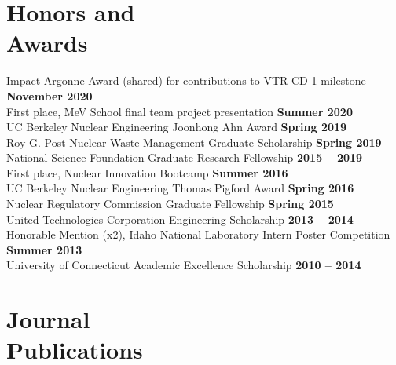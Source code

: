 \documentclass[margin,line]{resume}
\begin{document}
\begin{resume}
\section{\mysidestyle Honors and\\Awards}
Impact Argonne Award (shared) for contributions to VTR CD-1 milestone \hfill \textbf{November 2020}\vspace{.5mm} \\
First place, MeV School final team project presentation \hfill \textbf{Summer 2020}\vspace{.5mm} \\
UC Berkeley Nuclear Engineering Joonhong Ahn Award \hfill \textbf{Spring 2019}\vspace{.5mm} \\
Roy G. Post Nuclear Waste Management Graduate Scholarship \hfill \textbf{Spring 2019}\vspace{.5mm} \\
National Science Foundation Graduate Research Fellowship \hfill \textbf{2015 -- 2019}\vspace{.5mm} \\
First place, Nuclear Innovation Bootcamp \hfill \textbf{Summer 2016}\vspace{.5mm} \\
UC Berkeley Nuclear Engineering Thomas Pigford Award \hfill \textbf{Spring 2016}\vspace{.5mm} \\	
Nuclear Regulatory Commission Graduate Fellowship \hfill \textbf{Spring 2015}\vspace{.5mm} \\
United Technologies Corporation Engineering Scholarship \hfill \textbf{2013 -- 2014}\vspace{.5mm} \\
Honorable Mention (x2), Idaho National Laboratory Intern Poster Competition \hfill \textbf{Summer 2013}\vspace{.5mm} \\
University of Connecticut Academic Excellence Scholarship \hfill \textbf{2010 -- 2014} \\

\section{\mysidestyle Journal\\Publications}
\begin{bibenum}


\end{bibenum}
\end{resume}
\end{document}
